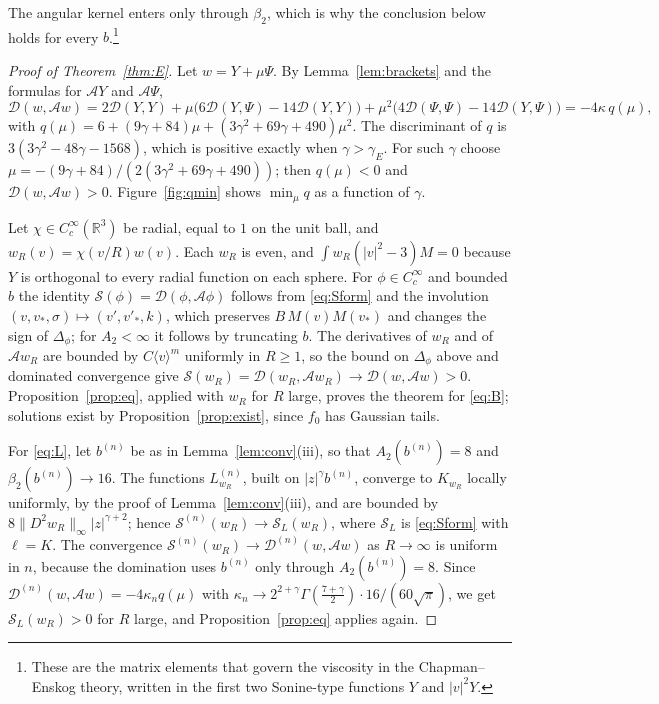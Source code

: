\documentclass[11pt]{amsart}
\theoremstyle{definition}
\newcommand{\RR}{\mathbb{R}}
\newcommand{\jb}[1]{\langle #1\rangle}
\begin{document}
The angular kernel enters only through $\beta_2$, which is why the conclusion below holds for every $b$.\footnote{These are the matrix elements that govern the viscosity in the Chapman--Enskog theory, written in the first two Sonine-type functions $Y$ and $|v|^2Y$.}

\begin{proof}[Proof of Theorem~\ref{thm:E}]
Let $w=Y+\mu\Psi$. By Lemma~\ref{lem:brackets} and the formulas for $\mathcal AY$ and $\mathcal A\Psi$,
\[
\mathcal D(w,\mathcal Aw)=2\mathcal D(Y,Y)+\mu\big(6\mathcal D(Y,\Psi)-14\mathcal D(Y,Y)\big)+\mu^2\big(4\mathcal D(\Psi,\Psi)-14\mathcal D(Y,\Psi)\big)=-4\kappa\,q(\mu),
\]
with $q(\mu)=6+(9\gamma+84)\mu+(3\gamma^2+69\gamma+490)\mu^2$. The discriminant of $q$ is $3(3\gamma^2-48\gamma-1568)$, which is positive exactly when $\gamma>\gamma_E$. For such $\gamma$ choose $\mu=-(9\gamma+84)/(2(3\gamma^2+69\gamma+490))$; then $q(\mu)<0$ and $\mathcal D(w,\mathcal Aw)>0$. Figure~\ref{fig:qmin} shows $\min_\mu q$ as a function of $\gamma$.

Let $\chi\in C^\infty_c(\RR^3)$ be radial, equal to $1$ on the unit ball, and $w_R(v)=\chi(v/R)w(v)$. Each $w_R$ is even, and $\int w_R(|v|^2-3)M=0$ because $Y$ is orthogonal to every radial function on each sphere. For $\phi\in C^\infty_c$ and bounded $b$ the identity $\mathcal S(\phi)=\mathcal D(\phi,\mathcal A\phi)$ follows from \eqref{eq:Sform} and the involution $(v,v_*,\sigma)\mapsto(v',v'_*,k)$, which preserves $B\,M(v)M(v_*)$ and changes the sign of $\Delta_\phi$; for $A_2<\infty$ it follows by truncating $b$. The derivatives of $w_R$ and of $\mathcal Aw_R$ are bounded by $C\jb{v}^m$ uniformly in $R\ge1$, so the bound on $\Delta_\phi$ above and dominated convergence give $\mathcal S(w_R)=\mathcal D(w_R,\mathcal Aw_R)\to\mathcal D(w,\mathcal Aw)>0$. Proposition~\ref{prop:eq}, applied with $w_R$ for $R$ large, proves the theorem for \eqref{eq:B}; solutions exist by Proposition~\ref{prop:exist}, since $f_0$ has Gaussian tails.

For \eqref{eq:L}, let $b^{(n)}$ be as in Lemma~\ref{lem:conv}(iii), so that $A_2(b^{(n)})=8$ and $\beta_2(b^{(n)})\to16$. The functions $L^{(n)}_{w_R}$, built on $|z|^\gamma b^{(n)}$, converge to $K_{w_R}$ locally uniformly, by the proof of Lemma~\ref{lem:conv}(iii), and are bounded by $8\|D^2w_R\|_\infty|z|^{\gamma+2}$; hence $\mathcal S^{(n)}(w_R)\to \mathcal S_L(w_R)$, where $\mathcal S_L$ is \eqref{eq:Sform} with $\ell=K$. The convergence $\mathcal S^{(n)}(w_R)\to\mathcal D^{(n)}(w,\mathcal Aw)$ as $R\to\infty$ is uniform in $n$, because the domination uses $b^{(n)}$ only through $A_2(b^{(n)})=8$. Since $\mathcal D^{(n)}(w,\mathcal Aw)=-4\kappa_nq(\mu)$ with $\kappa_n\to2^{2+\gamma}\Gamma(\frac{7+\gamma}2)\cdot16/(60\sqrt\pi)$, we get $\mathcal S_L(w_R)>0$ for $R$ large, and Proposition~\ref{prop:eq} applies again.
\end{proof}
\end{document}
